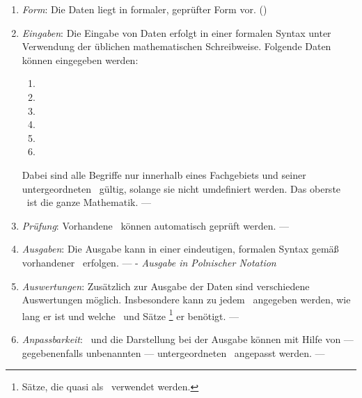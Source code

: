 %
\begin{enumerate}

	\item \label{Anforderung-Form} \emph{Form}:
	Die Daten liegt in formaler, geprüfter Form vor.
	()

	\item \label{Anforderung-Eingaben} \emph{Eingaben}:
	Die Eingabe von Daten erfolgt in einer formalen Syntax unter Verwendung der üblichen mathematischen Schreibweise.
	Folgende Daten können eingegeben werden:
	\begin{enumerate}
		\item \Axiome
		\item \Saetze
		\item \Beweise
		\item \Fachbegriffe
		\item \Fachgebiete
		\item \Ausgabeschemata
	\end{enumerate}
	Dabei sind alle Begriffe nur innerhalb eines Fachgebiets und seiner untergeordneten \Fachgebiete\ gültig, solange sie nicht umdefiniert werden.
	Das oberste \Fachgebiet\ ist die ganze Mathematik.
	--- 

	\item \label{Anforderung-Pruefung} \emph{Prüfung}:
	Vorhandene \Beweise\ können automatisch geprüft werden.
	--- 

	\item \label{Anforderung-Ausgaben} \emph{Ausgaben}:
	Die Ausgabe kann in einer eindeutigen, formalen Syntax gemäß vorhandener \Ausgabeschemata\ erfolgen.
	---  - \emph{Ausgabe in Polnischer Notation}

	\item \label{Anforderung-Auswertungen} \emph{Auswertungen}:
	Zusätzlich zur Ausgabe der Daten sind verschiedene Auswertungen möglich.
	Insbesondere kann zu jedem \Beweis\ angegeben werden, wie lang er ist und welche \Axiome\ und Sätze%
	\footnote{Sätze, die quasi als \Axiome\ verwendet werden.}
	er benötigt.
	--- 

	\item \label{Anforderung-Anpassbarkeit} \emph{Anpassbarkeit}:
	\Fachbegriffe\ und die Darstellung bei der Ausgabe können mit Hilfe von --- gegebenenfalls unbenannten --- untergeordneten \Fachgebieten\ angepasst werden.
	--- 


\end{enumerate}
